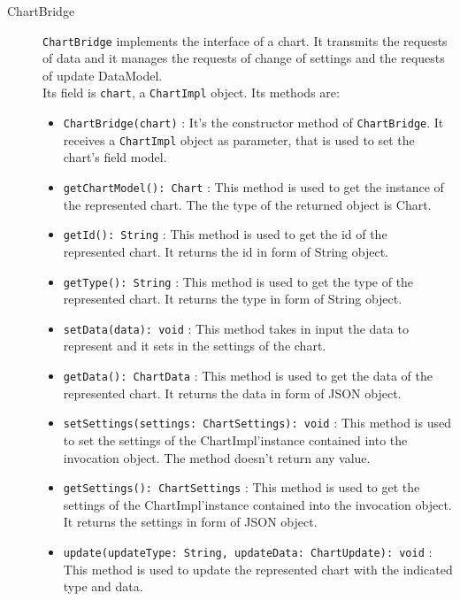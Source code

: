 \begin{description}
	\item[ChartBridge] \texttt{ChartBridge} implements the interface of a chart. It transmits the requests of data and it manages the requests of change of settings and the requests of update DataModel.\\
	Its field is \texttt{chart}, a \texttt{ChartImpl} object. Its methods are:
	\begin{itemize}
		\item \texttt{ChartBridge(chart)} : It's the constructor method of \texttt{ChartBridge}. It receives a \texttt{ChartImpl} object as parameter, that is used to set the chart's field model.
		\item \texttt{getChartModel(): Chart} : This method is used to get the instance of the represented chart. The the type of the returned object is Chart.
		\item \texttt{getId(): String} : This method is used to get the id of the represented chart. It returns the id in form of String object.
		\item \texttt{getType(): String} : This method is used to get the type of the represented chart. It returns the type in form of String object.
		\item \texttt{setData(data): void} : This method takes in input the data to represent and it sets in the settings of the chart.
		\item \texttt{getData(): ChartData} : This method is used to get the data of the represented chart. It returns the data in form of JSON object.
		\item \texttt{setSettings(settings: ChartSettings): void} : This method is used to set the settings of the ChartImpl'instance contained into the invocation object. The method doesn't return any value.
		\item \texttt{getSettings(): ChartSettings} : This method is used to get the settings of the ChartImpl'instance contained into the invocation object. It returns the settings in form of JSON object.
		\item \texttt{update(updateType: String, updateData: ChartUpdate): void} : This method is used to update the represented chart with the indicated type and data. 
	\end{itemize}
	\end{description}

